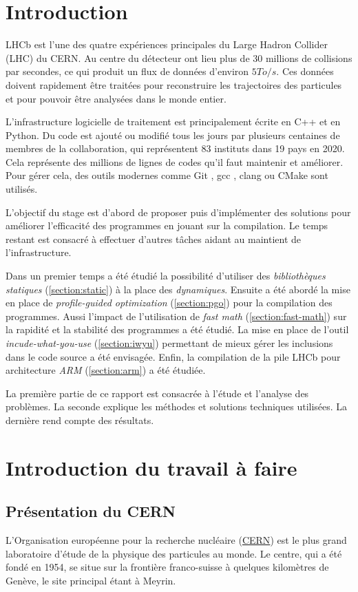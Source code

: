 \documentclass[a4paper,11pt]{report}
\begin{document}
\chapter*{Introduction}
LHCb est l'une des quatre expériences principales du Large Hadron Collider (LHC) du CERN.
Au centre du détecteur ont lieu plus de 30 millions de collisions par secondes, ce qui produit un flux de données d'environ $5 To/s$.
Ces données doivent rapidement être traitées pour reconstruire les trajectoires des particules et pour pouvoir être analysées dans le monde entier.

L'infrastructure logicielle de traitement est principalement écrite en C++ et en Python.
Du code est ajouté ou modifié tous les jours par plusieurs centaines de membres de la collaboration, qui représentent 83 instituts dans 19 pays en 2020.
Cela représente des millions de lignes de codes qu'il faut maintenir et améliorer.
Pour gérer cela, des outils modernes comme Git \cite{git}, gcc \cite{gcc}, clang \cite{clang} ou CMake \cite{cmake} sont utilisés.

L'objectif du stage est d'abord de proposer puis d'implémenter des solutions pour améliorer l'efficacité des programmes en jouant sur la compilation.
Le temps restant est consacré à effectuer d'autres tâches aidant au maintient de l'infrastructure.

Dans un premier temps a été étudié la possibilité d'utiliser des \emph{bibliothèques statiques} (\ref{section:static}) à la place des \emph{dynamiques}.
Ensuite a été abordé la mise en place de \emph{profile-guided optimization} (\ref{section:pgo}) pour la compilation des programmes.
Aussi l'impact de l'utilisation de \emph{fast math} (\ref{section:fast-math}) sur la rapidité et la stabilité des programmes a été étudié.
La mise en place de l'outil \emph{incude-what-you-use} (\ref{section:iwyu}) permettant de mieux gérer les inclusions dans le code source a été envisagée.
Enfin, la compilation de la pile LHCb pour architecture \emph{ARM} (\ref{section:arm}) a été étudiée.

La première partie de ce rapport est consacrée à l'étude et l'analyse des problèmes.
La seconde explique les méthodes et solutions techniques utilisées.
La dernière rend compte des résultats.


\chapter{Introduction du travail à faire}
\section{Présentation du CERN}
L'Organisation européenne pour la recherche nucléaire (\href{https://home.cern/}{CERN}) est le plus grand laboratoire d'étude de la physique des particules au monde.
Le centre, qui a été fondé en 1954, se situe sur la frontière franco-suisse à quelques kilomètres de Genève, le site principal étant à Meyrin.
\end{document}
